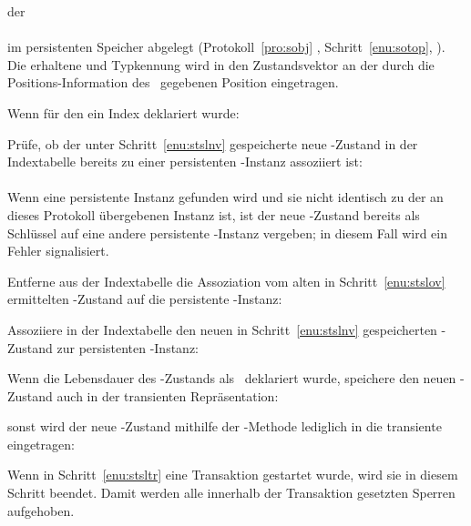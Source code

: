 \begin{infol}
\begin{block}
der \gfn\\
\\
im persistenten Speicher abgelegt (Protokoll~\ref{pro:sobj}
, Schritt~\ref{enu:sotop},
\citepage{\pageref{enu:sotop}}). Die erhaltene
\sobjid\/ und Typkennung wird in den Zustandsvektor an der durch
die Po\-si\-tions-In\-for\-ma\-tion des \sltdo[es]\ gegebenen Position
eingetragen.
%
\item Wenn f\"{u}r den \Slt\/ ein Index deklariert wurde:
%
\begin{block}
%
\item\label{enu:stsldk} Pr\"{u}fe, ob der unter Schritt~\ref{enu:stslnv}
gespeicherte neue \Slt\/-Zustand in der Indextabelle bereits zu einer
persistenten \clos-Instanz assoziiert ist:\\
\\
Wenn eine persistente Instanz gefunden wird und sie
nicht identisch zu der an dieses Protokoll \"{u}bergebenen Instanz ist,
ist der neue \Slt\/-Zustand bereits als Schl\"{u}s\-sel auf eine andere
persistente \clos-Instanz vergeben; in diesem Fall wird ein Fehler
signalisiert.
%
\item Entferne aus der Indextabelle die Assoziation vom alten in
Schritt~\ref{enu:stslov} ermittelten \Slt\/-Zustand auf die
persistente \clos-Instanz:\\
%
\item Assoziiere in der Indextabelle den neuen in
Schritt~\ref{enu:stslnv} gespeicherten \Slt\/-Zustand zur persistenten
\clos-Instanz:\\
%
\end{block}
%
\item Wenn die Lebensdauer des \Slt\/-Zustands als
\ deklariert wurde, speichere den
neuen \Slt\/-Zustand auch in der transienten Repr\"{a}sentation:\\
%
\end{block}
%
\item sonst wird der neue \Slt\/-Zustand mithilfe der \std-Methode
lediglich in die transiente \representation{} eingetragen:\\
%
\item Wenn in Schritt~\ref{enu:stsltr} eine Transaktion gestartet
wurde, wird sie in diesem Schritt beendet. Damit werden alle innerhalb
der Transaktion gesetzten Sperren aufgehoben.
%
\end{infol}
